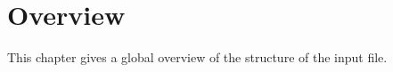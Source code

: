 %
%
%
%
%
% 
%
%

\chapter{Overview}\label{sec:OVERVIEW}
This chapter gives a global overview of the structure of the input file.



